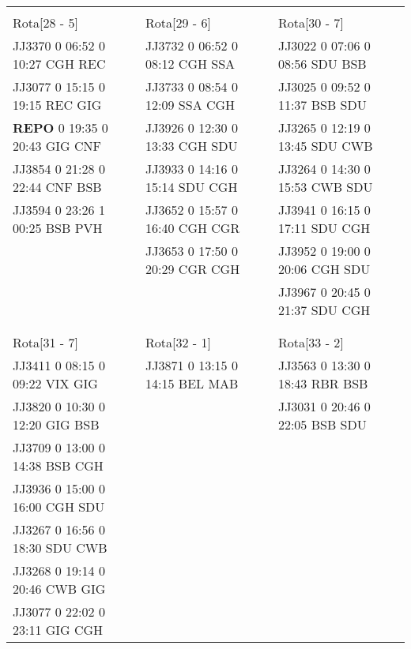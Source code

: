 \begin{scriptsize}
\begin{longtable}{l l l}
& & \\

Rota[28 - 5]  & Rota[29 - 6]  & Rota[30 - 7] \\
JJ3370 0 06:52 0 10:27 CGH REC & JJ3732 0 06:52 0 08:12 CGH SSA & JJ3022 0 07:06 0 08:56 SDU BSB\\
JJ3077 0 15:15 0 19:15 REC GIG & JJ3733 0 08:54 0 12:09 SSA CGH & JJ3025 0 09:52 0 11:37 BSB SDU\\
\textbf{REPO}   0 19:35 0 20:43 GIG CNF & JJ3926 0 12:30 0 13:33 CGH SDU & JJ3265 0 12:19 0 13:45 SDU CWB\\
JJ3854 0 21:28 0 22:44 CNF BSB & JJ3933 0 14:16 0 15:14 SDU CGH & JJ3264 0 14:30 0 15:53 CWB SDU\\
JJ3594 0 23:26 1 00:25 BSB PVH & JJ3652 0 15:57 0 16:40 CGH CGR & JJ3941 0 16:15 0 17:11 SDU CGH\\
 & JJ3653 0 17:50 0 20:29 CGR CGH & JJ3952 0 19:00 0 20:06 CGH SDU\\
 &  & JJ3967 0 20:45 0 21:37 SDU CGH\\

& & \\
& & \\


Rota[31 - 7]  & Rota[32 - 1]  & Rota[33 - 2] \\
JJ3411 0 08:15 0 09:22 VIX GIG & JJ3871 0 13:15 0 14:15 BEL MAB & JJ3563 0 13:30 0 18:43 RBR BSB\\
JJ3820 0 10:30 0 12:20 GIG BSB & & JJ3031 0 20:46 0 22:05 BSB SDU\\
JJ3709 0 13:00 0 14:38 BSB CGH & & \\
JJ3936 0 15:00 0 16:00 CGH SDU & & \\
JJ3267 0 16:56 0 18:30 SDU CWB & & \\
JJ3268 0 19:14 0 20:46 CWB GIG & & \\
JJ3077 0 22:02 0 23:11 GIG CGH & & \\


\end{longtable}

\end{scriptsize}
